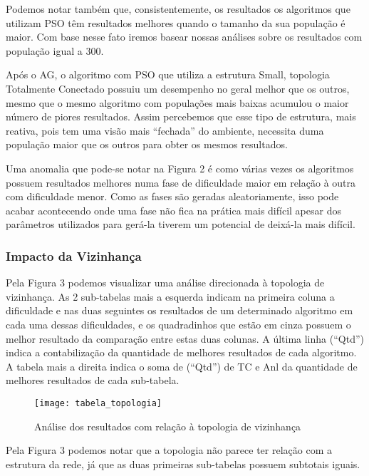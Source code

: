 \documentclass[a4paper,12pt]{article}
\begin{document}
    Podemos notar também que, consistentemente, os resultados os algoritmos que utilizam PSO têm 
    resultados melhores quando o tamanho da sua população é maior. Com base nesse fato iremos 
    basear nossas análises sobre os resultados com população igual a 300.
    
    Após o AG, o algoritmo com PSO que utiliza a estrutura Small, topologia Totalmente Conectado 
    possuiu um desempenho no geral melhor que os outros, mesmo que o mesmo algoritmo com 
    populações mais baixas acumulou o maior número de piores resultados. Assim percebemos que 
    esse tipo de estrutura, mais reativa, pois tem uma visão mais “fechada” do ambiente, 
    necessita duma população maior que os outros para obter os mesmos resultados.
    
    Uma anomalia que pode-se notar na Figura 2 é como várias vezes os algoritmos possuem 
    resultados melhores numa fase de dificuldade maior em relação à outra com dificuldade 
    menor. Como as fases são geradas aleatoriamente, isso pode acabar acontecendo onde 
    uma fase não fica na prática mais difícil apesar dos parâmetros utilizados para gerá-la 
    tiverem um potencial de deixá-la mais difícil.
      
    \subsubsection{Impacto da Vizinhança}
    
      Pela Figura 3 podemos visualizar uma análise direcionada à topologia de vizinhança. 
      As 2 sub-tabelas mais a esquerda indicam na primeira coluna a dificuldade e nas duas 
      seguintes os resultados de um determinado algoritmo em cada uma dessas dificuldades, 
      e os quadradinhos que estão em cinza possuem o melhor resultado da comparação entre 
      estas duas colunas. A última linha (“Qtd”) indica a contabilização da quantidade de 
      melhores resultados de cada algoritmo. A tabela mais a direita indica o soma de 
      (“Qtd”) de TC e Anl da quantidade de melhores resultados de cada sub-tabela.

      \begin{figure}[!htb]
	\centering
	\texttt{[image: tabela\_topologia]}
	\caption{Análise dos resultados com relação à topologia de vizinhança}
	\label{Figura 3}
      \end{figure}
      
      Pela Figura 3 podemos notar que a topologia não parece ter relação com a estrutura 
      da rede, já que as duas primeiras sub-tabelas possuem subtotais iguais.
      
\end{document}
